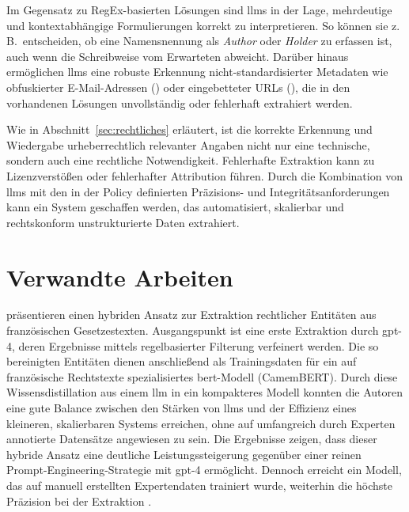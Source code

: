Im Gegensatz zu RegEx-basierten Lösungen sind \glspl{llm} in der Lage, mehrdeutige und kontextabhängige Formulierungen korrekt zu interpretieren.
So können sie z.\,B.\ entscheiden, ob eine Namensnennung als \textit{Author} oder \textit{Holder} zu erfassen ist, auch wenn die Schreibweise vom Erwarteten abweicht.
Darüber hinaus ermöglichen \glspl{llm} eine robuste Erkennung nicht-standardisierter Metadaten wie obfuskierter E-Mail-Adressen () oder eingebetteter URLs (), die in den vorhandenen Lösungen unvollständig oder fehlerhaft extrahiert werden.

Wie in Abschnitt~\ref{sec:rechtliches} erläutert, ist die korrekte Erkennung und Wiedergabe urheberrechtlich relevanter Angaben nicht nur eine technische, sondern auch eine rechtliche Notwendigkeit.
Fehlerhafte Extraktion kann zu Lizenzverstößen oder fehlerhafter Attribution führen.
Durch die Kombination von \glspl{llm} mit den in der Policy definierten Präzisions- und Integritätsanforderungen kann ein System geschaffen werden, das automatisiert, skalierbar und rechtskonform unstrukturierte Daten extrahiert.


\section{Verwandte Arbeiten}\label{sec:verwandte-arbeiten}

\citeauthor{breton_empowering_2024} \autocite{breton_empowering_2024} präsentieren einen hybriden Ansatz zur Extraktion rechtlicher Entitäten aus französischen Gesetzestexten.
Ausgangspunkt ist eine erste Extraktion durch \gls{gpt}-4, deren Ergebnisse mittels regelbasierter Filterung verfeinert werden.
Die so bereinigten Entitäten dienen anschließend als Trainingsdaten für ein auf französische Rechtstexte spezialisiertes \gls{bert}-Modell (CamemBERT). Durch diese Wissensdistillation aus einem \gls{llm} in ein kompakteres Modell konnten die Autoren eine gute Balance zwischen den Stärken von \glspl{llm} und der Effizienz eines kleineren, skalierbaren Systems erreichen, ohne auf umfangreich durch Experten annotierte Datensätze angewiesen zu sein.
Die Ergebnisse zeigen, dass dieser hybride Ansatz eine deutliche Leistungssteigerung gegenüber einer reinen Prompt-Engineering-Strategie mit \gls{gpt}-4 ermöglicht.
Dennoch erreicht ein Modell, das auf manuell erstellten Expertendaten trainiert wurde, weiterhin die höchste Präzision bei der Extraktion \autocite{breton_empowering_2024}.

